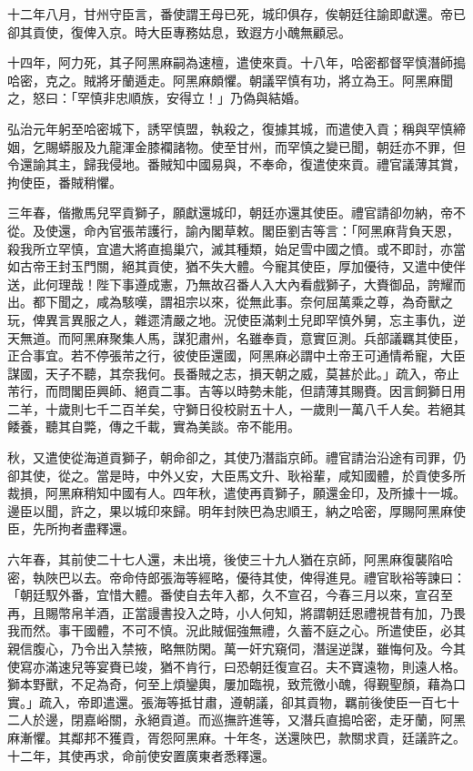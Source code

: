 \begin{pinyinscope}
十二年八月，甘州守臣言，番使謂王母已死，城印俱存，俟朝廷往諭即獻還。帝已卻其貢使，復俾入京。時大臣專務姑息，致遐方小醜無顧忌。

十四年，阿力死，其子阿黑麻嗣為速檀，遣使來貢。十八年，哈密都督罕慎潛師搗哈密，克之。賊將牙蘭遁走。阿黑麻頗懼。朝議罕慎有功，將立為王。阿黑麻聞之，怒曰：「罕慎非忠順族，安得立！」乃偽與結婚。

弘治元年躬至哈密城下，誘罕慎盟，執殺之，復據其城，而遣使入貢；稱與罕慎締姻，乞賜蟒服及九龍渾金膝襴諸物。使至甘州，而罕慎之變已聞，朝廷亦不罪，但令還諭其主，歸我侵地。番賊知中國易與，不奉命，復遣使來貢。禮官議薄其賞，拘使臣，番賊稍懼。

三年春，偕撒馬兒罕貢獅子，願獻還城印，朝廷亦還其使臣。禮官請卻勿納，帝不從。及使還，命內官張芾護行，諭內閣草敕。閣臣劉吉等言：「阿黑麻背負天恩，殺我所立罕慎，宜遣大將直搗巢穴，滅其種類，始足雪中國之憤。或不即討，亦當如古帝王封玉門關，絕其貢使，猶不失大體。今寵其使臣，厚加優待，又遣中使伴送，此何理哉！陛下事遵成憲，乃無故召番人入大內看戲獅子，大賚御品，誇耀而出。都下聞之，咸為駭嘆，謂祖宗以來，從無此事。奈何屈萬乘之尊，為奇獸之玩，俾異言異服之人，雜遝清嚴之地。況使臣滿剌土兒即罕慎外舅，忘主事仇，逆天無道。而阿黑麻聚集人馬，謀犯肅州，名雖奉貢，意實叵測。兵部議羈其使臣，正合事宜。若不停張芾之行，彼使臣還國，阿黑麻必謂中土帝王可通情希寵，大臣謀國，天子不聽，其奈我何。長番賊之志，損天朝之威，莫甚於此。」疏入，帝止芾行，而問閣臣興師、絕貢二事。吉等以時勢未能，但請薄其賜賚。因言飼獅日用二羊，十歲則七千二百羊矣，守獅日役校尉五十人，一歲則一萬八千人矣。若絕其餧養，聽其自斃，傳之千載，實為美談。帝不能用。

秋，又遣使從海道貢獅子，朝命卻之，其使乃潛詣京師。禮官請治沿途有司罪，仍卻其使，從之。當是時，中外乂安，大臣馬文升、耿裕輩，咸知國體，於貢使多所裁損，阿黑麻稍知中國有人。四年秋，遣使再貢獅子，願還金印，及所據十一城。邊臣以聞，許之，果以城印來歸。明年封陜巴為忠順王，納之哈密，厚賜阿黑麻使臣，先所拘者盡釋還。

六年春，其前使二十七人還，未出境，後使三十九人猶在京師，阿黑麻復襲陷哈密，執陜巴以去。帝命侍郎張海等經略，優待其使，俾得進見。禮官耿裕等諫曰：「朝廷馭外番，宜惜大體。番使自去年入都，久不宣召，今春三月以來，宣召至再，且賜幣帛羊酒，正當謾書投入之時，小人何知，將謂朝廷恩禮視昔有加，乃畏我而然。事干國體，不可不慎。況此賊倔強無禮，久蓄不庭之心。所遣使臣，必其親信腹心，乃令出入禁掖，略無防閑。萬一奸宄窺伺，潛逞逆謀，雖悔何及。今其使寫亦滿速兒等宴賚已竣，猶不肯行，曰恐朝廷復宣召。夫不寶遠物，則遠人格。獅本野獸，不足為奇，何至上煩鑾輿，屢加臨視，致荒徼小醜，得覲聖顏，藉為口實。」疏入，帝即遣還。張海等抵甘肅，遵朝議，卻其貢物，羈前後使臣一百七十二人於邊，閉嘉峪關，永絕貢道。而巡撫許進等，又潛兵直搗哈密，走牙蘭，阿黑麻漸懼。其鄰邦不獲貢，胥怨阿黑麻。十年冬，送還陜巴，款關求貢，廷議許之。十二年，其使再求，命前使安置廣東者悉釋還。


\end{pinyinscope}
